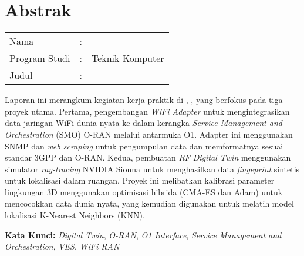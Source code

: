 %
%
%

\chapter*{Abstrak}

\vspace*{0.2cm}
{
	\setlength{\parindent}{0pt}
	
	\begin{tabular}{@{}l l p{10cm}}
		Nama&: & \penulis \\
		Program Studi&: & Teknik Komputer \\
		Judul&: & \judul \\
	\end{tabular}

	\bigskip
	\bigskip

    Laporan ini merangkum kegiatan kerja praktik di \namaLab, \namaUniv, yang berfokus pada tiga proyek utama. Pertama, pengembangan \textit{WiFi Adapter} untuk mengintegrasikan data jaringan WiFi dunia nyata ke dalam kerangka \textit{Service Management and Orchestration} (SMO) O-RAN melalui antarmuka O1. Adapter ini menggunakan SNMP dan \textit{web scraping} untuk pengumpulan data dan memformatnya sesuai standar 3GPP dan O-RAN. Kedua, pembuatan \textit{RF Digital Twin} menggunakan simulator \textit{ray-tracing} NVIDIA Sionna untuk menghasilkan data \textit{fingeprint} sintetis untuk lokalisasi dalam ruangan. Proyek ini melibatkan kalibrasi parameter lingkungan 3D menggunakan optimisasi hibrida (CMA-ES dan Adam) untuk mencocokkan data dunia nyata, yang kemudian digunakan untuk melatih model lokalisasi K-Nearest Neighbors (KNN).


    \vspace{1em}
    \noindent
    \textbf{Kata Kunci:} \textit{Digital Twin}, \textit{O-RAN}, \textit{O1 Interface}, \textit{Service Management and Orchestration}, \textit{VES}, \textit{WiFi RAN}
}

\newpage